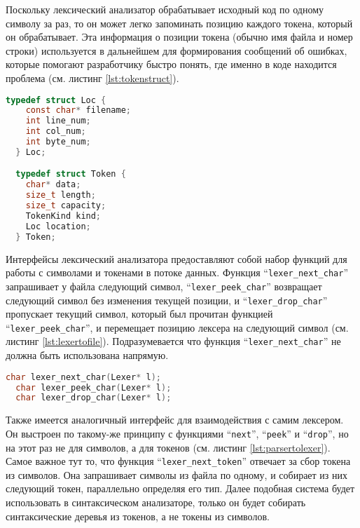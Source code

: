 Поскольку лексический анализатор обрабатывает исходный код по одному символу за раз, то он может легко запоминать позицию каждого токена, который он обрабатывает. Эта информация о позиции токена (обычно имя файла и номер строки) используется в дальнейшем для формирования сообщений об ошибках, которые помогают разработчику быстро понять, где именно в коде находится проблема (см. листинг \ref{lst:tokenstruct}).

\begin{lstlisting}[language=c, caption={Cтруктура токена и его позиции}, label={lst:tokenstruct}]
  typedef struct Loc {
    const char* filename;
    int line_num;
    int col_num;
    int byte_num;
  } Loc;

  typedef struct Token {
    char* data;
    size_t length;
    size_t capacity;
    TokenKind kind;
    Loc location;
  } Token;
\end{lstlisting}

Интерфейсы лексический анализатора предоставляют собой набор функций для работы с символами и токенами в потоке данных.
Функция ``\texttt{lexer_next_char}'' запрашивает у файла следующий символ, ``\texttt{lexer_peek_char}'' возвращает следующий символ без изменения текущей позиции, и ``\texttt{lexer_drop_char}'' пропускает текущий символ, который был прочитан функцией ``\texttt{lexer_peek_char}'', и перемещает позицию лексера на следующий символ (см. листинг \ref{lst:lexertofile}).
Подразумевается что функция ``\texttt{lexer_next_char}'' не должна быть использована напрямую.

\begin{lstlisting}[language=c, caption={Интерфейс между лексером и файлом}, label={lst:lexertofile}]
  char lexer_next_char(Lexer* l);
  char lexer_peek_char(Lexer* l);
  char lexer_drop_char(Lexer* l);
\end{lstlisting}

Также имеется аналогичный интерфейс для взаимодействия с самим лексером.
Он выстроен по такому-же принципу с функциями ``\texttt{next}'', ``\texttt{peek}'' и ``\texttt{drop}'', но на этот раз не для символов, а для токенов (см. листинг \ref{lst:parsertolexer}).
Самое важное тут то, что функция ``\texttt{lexer_next_token}'' отвечает за сбор токена из символов.
Она запрашивает символы из файла по одному, и собирает из них следующий токен, параллельно определяя его тип.
Далее подобная система будет использовать в синтаксическом анализаторе, только он будет собирать синтаксические деревья из токенов, а не токены из символов.

